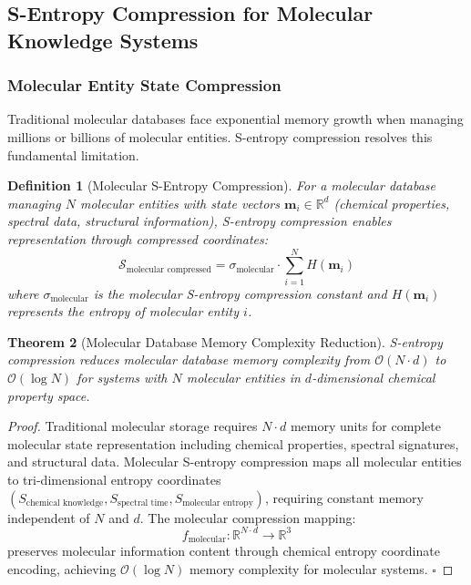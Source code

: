 \documentclass[11pt,a4paper]{article}
\newtheorem{theorem}{Theorem}[section]
\newtheorem{definition}[theorem]{Definition}
\theoremstyle{remark}
\begin{document}
\subsection{S-Entropy Compression for Molecular Knowledge Systems}

\subsubsection{Molecular Entity State Compression}

Traditional molecular databases face exponential memory growth when managing millions or billions of molecular entities. S-entropy compression resolves this fundamental limitation.

\begin{definition}[Molecular S-Entropy Compression]
For a molecular database managing $N$ molecular entities with state vectors $\mathbf{m}_i \in \mathbb{R}^d$ (chemical properties, spectral data, structural information), S-entropy compression enables representation through compressed coordinates:
\begin{equation}
\mathcal{S}_{\text{molecular compressed}} = \sigma_{\text{molecular}} \cdot \sum_{i=1}^{N} H(\mathbf{m}_i)
\end{equation}
where $\sigma_{\text{molecular}}$ is the molecular S-entropy compression constant and $H(\mathbf{m}_i)$ represents the entropy of molecular entity $i$.
\end{definition}

\begin{theorem}[Molecular Database Memory Complexity Reduction]
S-entropy compression reduces molecular database memory complexity from $\mathcal{O}(N \cdot d)$ to $\mathcal{O}(\log N)$ for systems with $N$ molecular entities in $d$-dimensional chemical property space.
\end{theorem}

\begin{proof}
Traditional molecular storage requires $N \cdot d$ memory units for complete molecular state representation including chemical properties, spectral signatures, and structural data. Molecular S-entropy compression maps all molecular entities to tri-dimensional entropy coordinates $(S_{\text{chemical knowledge}}, S_{\text{spectral time}}, S_{\text{molecular entropy}})$, requiring constant memory independent of $N$ and $d$. The molecular compression mapping:
\begin{equation}
f_{\text{molecular}}: \mathbb{R}^{N \cdot d} \rightarrow \mathbb{R}^3
\end{equation}
preserves molecular information content through chemical entropy coordinate encoding, achieving $\mathcal{O}(\log N)$ memory complexity for molecular systems. $\square$
\end{proof}
\end{document}
